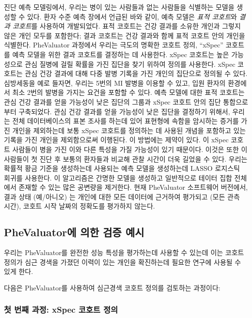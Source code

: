 \documentclass[11pt]{book}
\theoremstyle{definition}
\theoremstyle{definition}
\theoremstyle{definition}
\theoremstyle{remark}
\begin{document}
진단 예측 모델링에서, 우리는 병이 있는 사람들과 없는 사람들을 식별하는
모델을 생성할 수 있다. 환자 수준 예측 장에서 언급된 바와 같이, 예측
모델은 \emph{표적 코호트}와 \emph{결과 코호트}를 사용하여 개발되었다.
표적 코호트는 건강 결과를 소유한 개인과 그렇지 않은 개인 모두를
포함한다; 결과 코호트는 건강 결과와 함께 표적 코호트 안의 개인을
식별한다. PheValuator 과정에서 우리는 극도의 명확한 코호트 정의,
``xSpec'' 코호트를 예측 모델을 위한 결과 코호트를 결정하는 데 사용한다.
xSpec 코호트는 높은 가능성으로 관심 질병에 걸릴 확률을 가진 집단을 찾기
위하여 정의를 사용한다. xSpec 코호트는 관심 건강 결과에 대해 다중 발병
기록을 가진 개인의 집단으로 정의될 수 있다. 심방세동을 예로 들자면,
우리는 5번의 MI 발병을 이용할 수 있고, 입원 환자의 환경에서 최소 2번의
발병을 가지는 요건을 포함할 수 있다. 예측 모델에 대한 표적 코호트는 관심
건강 결과를 얻을 가능성이 낮은 집단의 그룹과 xSpec 코호트 안의 집단
통합으로부터 구축되었다. 관심 건강 결과를 얻을 가능성이 낮은 집단을
결정하기 위해서, 우리는 전체 데이터베이스의 표본 조사를 하는데 있어
표현형에 속함을 암시하는 증거를 가진 개인을 제외하는데 보통 xSpec
코호트를 정의하는 데 사용된 개념을 포함하고 있는 기록을 가진 개인을
제외함으로써 이행된다. 이 방법에는 제약이 있다. 이 xSpec 코호트 사람들이
병을 가진 이와 다른 특성을 가질 가능성이 있기 때문이다. 이것은 또한 이
사람들이 첫 진단 후 보통의 환자들과 비교해 관찰 시간이 더욱 길었을 수
있다. 우리는 확률적 황금 기준을 생성하는데 사용되는 예측 모델을
생성하는데 LASSO 로지스틱 회귀를 사용한다. \citep{suchard_2013} 이
알고리즘은 간명한 모델을 생성하고 일반적으로 테이터 집합 전체에서 존재할
수 있는 많은 공변량을 제거한다. 현재 PheValuator 소프트웨어 버전에서,
결과 상태 (예/아니오) 는 개인에 대한 모든 데이터에 근거하여 평가되고
(모든 관측 시간), 코호트 시작 날짜의 정확도를 평가하지 않는다.

\subsection{PheValuator에 의한 검증 예시}\label{phevaluator---}

우리는 PheValuator를 완전한 성능 특성을 평가하는데 사용할 수 있는데 이는
코호트 정의가 심근 경색을 가졌던 이력이 있는 개인을 확진하는데 필요한
연구에 사용될 수 있게 한다.

다음은 PheValuator를 사용하여 심근경색 코호트 정의를 검토하는 과정이다:

\subsubsection*{첫 번째 과정: xSpec 코호트 정의}\label{---xspec--}
\end{document}
